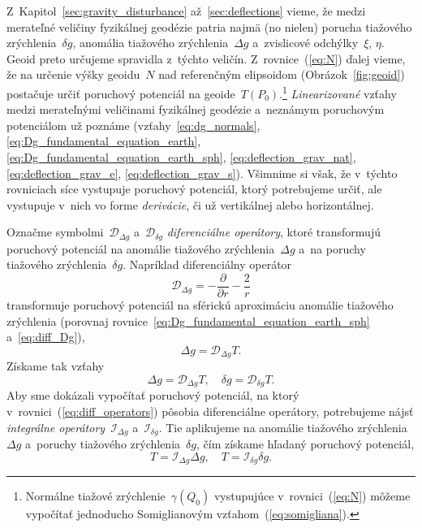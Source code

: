 \documentclass[a4paper, 12pt]{book}
\newcommand{\DIFF}{\mathcal D}
\newcommand{\INT}{\mathcal I}
\begin{document}
Z~Kapitol~\ref{sec:gravity_disturbance} až~\ref{sec:deflections} vieme, že 
medzi merateľné veličiny fyzikálnej geodézie patria najmä (no nielen) porucha 
tiažového zrýchlenia~$\delta g$, anomália tiažového zrýchlenia~$\Delta g$ 
a~zvislicové odchýlky~$\xi$, $\eta$.  Geoid preto určujeme spravidla z~týchto 
veličín.  Z~rovnice~(\ref{eq:N}) ďalej vieme, že na určenie výšky geoidu~$N$ 
nad referenčným elipsoidom (Obrázok~\ref{fig:geoid}) postačuje určiť poruchový 
potenciál na geoide~$T(P_0)$.\footnote{Normálne tiažové 
zrýchlenie~$\gamma(Q_0)$ vystupujúce v~rovnici~(\ref{eq:N}) môžeme vypočítať 
jednoducho Somiglianovým vzťahom~(\ref{eq:somigliana}).}  \emph{Linearizované} 
vzťahy medzi merateľnými veličinami fyzikálnej geodézie a~neznámym poruchovým 
potenciálom už poznáme (vzťahy~\ref{eq:dg_normals}, 
\ref{eq:Dg_fundamental_equation_earth}, 
\ref{eq:Dg_fundamental_equation_earth_sph}, \ref{eq:deflection_grav_nat}, 
\ref{eq:deflection_grav_e}, \ref{eq:deflection_grav_s}).  Všimnime si však, že 
v~týchto rovniciach síce vystupuje poruchový potenciál, ktorý potrebujeme 
určiť, ale vystupuje v~nich vo forme \emph{derivácie}, či už vertikálnej alebo 
horizontálnej.

Označme symbolmi~$\DIFF_{\Delta g}$ a~$\DIFF_{\delta g}$ \emph{diferenciálne 
operátory}, ktoré transformujú poruchový potenciál na anomálie tiažového 
zrýchlenia~$\Delta g$ a~na poruchy tiažového zrýchlenia~$\delta g$.  Napríklad 
diferenciálny operátor
%
\begin{equation}
\label{eq:diff_Dg}
\DIFF_{\Delta g} = -\frac{\partial}{\partial r} - \frac{2}{r}
\end{equation}
%
transformuje poruchový potenciál na sférickú aproximáciu anomálie tiažového 
zrýchlenia (porovnaj rovnice~\ref{eq:Dg_fundamental_equation_earth_sph} 
a~\ref{eq:diff_Dg}),
%
\begin{equation}
\Delta g = \DIFF_{\Delta g} T{.}
\end{equation}
%
Získame tak vzťahy
%
\begin{equation}
\label{eq:diff_operators}
\Delta g = \DIFF_{\Delta g}T{,} \quad \delta g = \DIFF_{\delta g}T{.}
\end{equation}
%
Aby sme dokázali vypočítať poruchový potenciál, na ktorý 
v~rovnici~(\ref{eq:diff_operators}) pôsobia diferenciálne operátory, 
potrebujeme nájsť \emph{integrálne operátory}~$\INT_{\Delta g}$ a~$\INT_{\delta 
g}$.  Tie aplikujeme na anomálie tiažového zrýchlenia~$\Delta g$ a~poruchy 
tiažového zrýchlenia~$\delta g$, čím získame hľadaný poruchový potenciál,
%
\begin{equation}
\label{eq:int_operators}
T = \INT_{\Delta g} \Delta g{,} \quad T = \INT_{\delta g}\delta g{.}
\end{equation}
\end{document}
